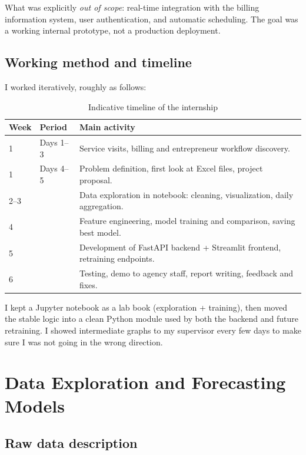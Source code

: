 \documentclass[12pt,a4paper]{report}
\begin{document}
What was explicitly \textit{out of scope}: real-time integration with the billing information system, user authentication, and automatic scheduling. The goal was a working internal prototype, not a production deployment.

\section{Working method and timeline}

I worked iteratively, roughly as follows:

\begin{table}[H]
\centering
\caption{Indicative timeline of the internship}
\begin{tabular}{@{}llp{8cm}@{}}
\toprule
Week & Period & Main activity \\
\midrule
1 & Days 1--3 & Service visits, billing and entrepreneur workflow discovery. \\
1 & Days 4--5 & Problem definition, first look at Excel files, project proposal. \\
2--3 & & Data exploration in notebook: cleaning, visualization, daily aggregation. \\
4 & & Feature engineering, model training and comparison, saving best model. \\
5 & & Development of FastAPI backend + Streamlit frontend, retraining endpoints. \\
6 & & Testing, demo to agency staff, report writing, feedback and fixes. \\
\bottomrule
\end{tabular}
\end{table}

I kept a Jupyter notebook as a lab book (exploration + training), then moved the stable logic into a clean Python module used by both the backend and future retraining. I showed intermediate graphs to my supervisor every few days to make sure I was not going in the wrong direction.

\chapter{Data Exploration and Forecasting Models}

\section{Raw data description}
\end{document}
